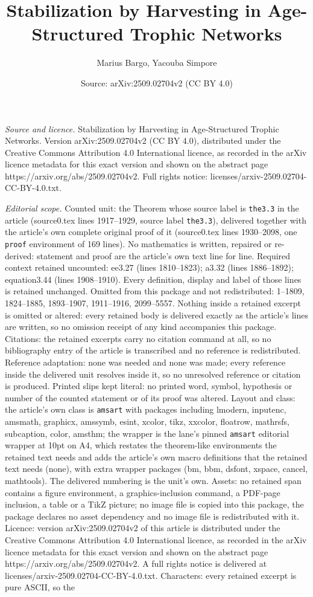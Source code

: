 \documentclass[10pt,a4paper]{amsart}
\title[Stabilization by Harvesting in Age-Structured Trophic Networ]{Stabilization by Harvesting in Age-Structured Trophic Networks}
\author{Marius Bargo, Yacouba Simpore}
\date{Source: arXiv:2509.02704v2 (CC BY 4.0)}
\begin{document}
\maketitle

\noindent\emph{Source and licence.} Stabilization by Harvesting in Age-Structured Trophic Networks. Version arXiv:2509.02704v2 (CC BY 4.0), distributed under the Creative Commons Attribution 4.0 International licence, as recorded in the arXiv licence metadata for this exact version and shown on the abstract page https://arxiv.org/abs/2509.02704v2. Full rights notice: licenses/arxiv-2509.02704-CC-BY-4.0.txt.\par\smallskip

\noindent\textit{Editorial scope.} Counted unit: the Theorem whose source label is \texttt{the3.3} in the article (source0.tex lines 1917--1929, source label \texttt{the3.3}), delivered together with the article's own complete original proof of it (source0.tex lines 1930--2098, one \texttt{proof} environment of 169 lines). No mathematics is written, repaired or re-derived: statement and proof are the article's own text line for line. Required context retained uncounted: ee3.27 (lines 1810--1823); a3.32 (lines 1886--1892); equation3.44 (lines 1908--1910). Every definition, display and label of those lines is retained unchanged. Omitted from this package and not redistributed: 1--1809, 1824--1885, 1893--1907, 1911--1916, 2099--5557. Nothing inside a retained excerpt is omitted or altered: every retained body is delivered exactly as the article's lines are written, so no omission receipt of any kind accompanies this package. Citations: the retained excerpts carry no citation command at all, so no bibliography entry of the article is transcribed and no reference is redistributed. Reference adaptation: none was needed and none was made; every reference inside the delivered unit resolves inside it, so no unresolved reference or citation is produced. Printed slips kept literal: no printed word, symbol, hypothesis or number of the counted statement or of its proof was altered. Layout and class: the article's own class is \texttt{amsart} with packages including lmodern, inputenc, amsmath, graphicx, amssymb, esint, xcolor, tikz, xxcolor, floatrow, mathrsfs, subcaption, color, amsthm; the wrapper is the lane's pinned \texttt{amsart} editorial wrapper at 10pt on A4, which restates the theorem-like environments the retained text needs and adds the article's own macro definitions that the retained text needs (none), with extra wrapper packages (bm, bbm, dsfont, xspace, cancel, mathtools). The delivered numbering is the unit's own. Assets: no retained span contains a figure environment, a graphics-inclusion command, a PDF-page inclusion, a table or a TikZ picture; no image file is copied into this package, the package declares no asset dependency and no image file is redistributed with it. Licence: version arXiv:2509.02704v2 of this article is distributed under the Creative Commons Attribution 4.0 International licence, as recorded in the arXiv licence metadata for this exact version and shown on the abstract page https://arxiv.org/abs/2509.02704v2. A full rights notice is delivered at licenses/arxiv-2509.02704-CC-BY-4.0.txt. Characters: every retained excerpt is pure ASCII, so the 
\end{document}
